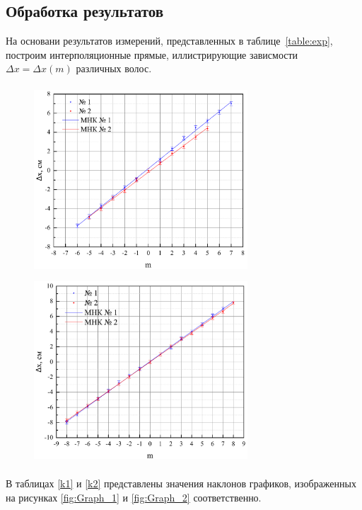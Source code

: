 \documentclass[a4paper,12pt]{article} %
\begin{document}
\subsection{Обработка результатов}
	На основани результатов измерений, представленных в таблице~\ref{table:exp}, построим интерполяционные прямые, иллистрирующие зависмости $\Delta x = \Delta x (m)$ различных волос.
	\begin{figure}[h!]
		\begin{floatrow}
			{\includegraphics[width=8cm,height=7cm]{Graph1}}
			{\includegraphics[width=8cm,height=7cm]{Graph2}}         
		\end{floatrow}
	\end{figure}

	В таблицах \ref{k1} и \ref{k2} представлены значения наклонов графиков, изображенных на рисунках \ref{fig:Graph_1} и \ref{fig:Graph_2} соответственно.
	
\end{document}
